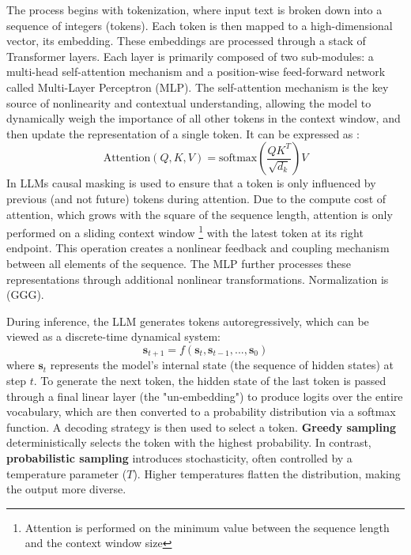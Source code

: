 \documentclass[a4paper,12pt]{article}
\begin{document}
The process begins with tokenization, where input text is broken down into a sequence of integers (tokens). Each token is then mapped to a high-dimensional vector, its embedding. These embeddings are processed through a stack of Transformer layers. Each layer is primarily composed of two sub-modules: a multi-head self-attention mechanism and a position-wise feed-forward network called Multi-Layer Perceptron (MLP). The self-attention mechanism is the key source of nonlinearity and contextual understanding, allowing the model to dynamically weigh the importance of all other tokens in the context window, and then update the representation of a single token. It can be expressed as \cite{attention}:
\begin{equation}
    \text{Attention}(Q, K, V) = \text{softmax}\left(\frac{QK^T}{\sqrt{d_k}}\right)V
\end{equation}
In LLMs causal masking is used to ensure that a token is only influenced by previous (and not future) tokens during attention. Due to the compute cost of attention, which grows with the square of the sequence length, attention is only performed on a sliding context window \footnote{Attention is performed on the minimum value between the sequence length and the context window size} with the latest token at its right endpoint.
This operation creates a nonlinear feedback and coupling mechanism between all elements of the sequence. The MLP further processes these representations through additional nonlinear transformations. Normalization is (GGG). 

During inference, the LLM generates tokens autoregressively, which can be viewed as a discrete-time dynamical system:
\begin{equation}
    \mathbf{s}_{t+1} = f(\mathbf{s}_t, \mathbf{s}_{t-1}, ..., \mathbf{s}_0) %
\end{equation}
where $\mathbf{s}_t$ represents the model's internal state (the sequence of hidden states) at step $t$. To generate the next token, the hidden state of the last token is passed through a final linear layer (the "un-embedding") to produce logits over the entire vocabulary, which are then converted to a probability distribution via a softmax function. A decoding strategy is then used to select a token. \textbf{Greedy sampling} deterministically selects the token with the highest probability. In contrast, \textbf{probabilistic sampling} introduces stochasticity, often controlled by a temperature parameter ($T$). Higher temperatures flatten the distribution, making the output more diverse.
\end{document}
